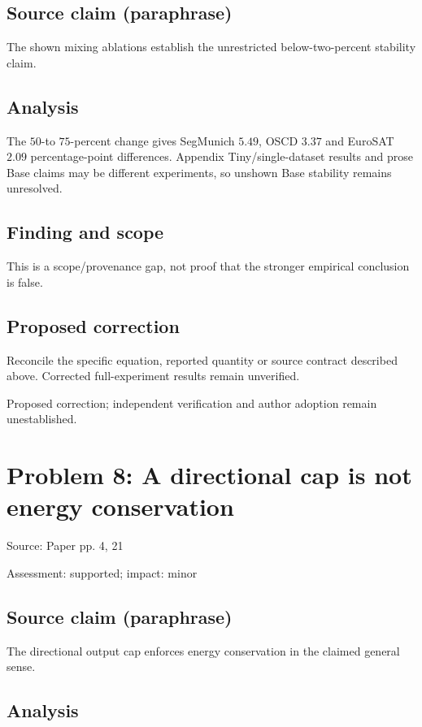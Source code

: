 \documentclass[11pt]{article}
\begin{document}
\subsection*{Source claim (paraphrase)}

The shown mixing ablations establish the unrestricted below-two-percent stability claim.

\subsection*{Analysis}

The \(50\)-to \(75\)-percent change gives SegMunich \(5.49\), OSCD \(3.37\) and EuroSAT \(2.09\) percentage-point differences. Appendix Tiny/single-dataset results and prose Base claims may be different experiments, so unshown Base stability remains unresolved.

\subsection*{Finding and scope}

This is a scope/provenance gap, not proof that the stronger empirical conclusion is false.

\subsection*{Proposed correction}

Reconcile the specific equation, reported quantity or source contract described above. Corrected full-experiment results remain unverified.

Proposed correction; independent verification and author adoption remain unestablished.

\section*{Problem 8: A directional cap is not energy conservation}

Source: Paper pp. 4, 21

Assessment: supported; impact: minor

\subsection*{Source claim (paraphrase)}

The directional output cap enforces energy conservation in the claimed general sense.

\subsection*{Analysis}
\end{document}
